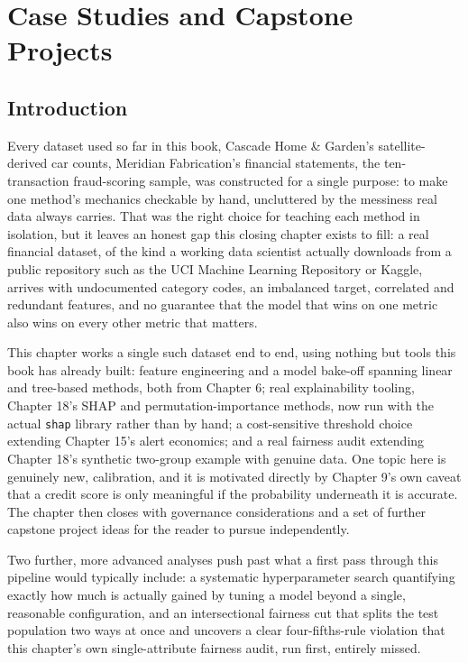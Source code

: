 \documentclass[../ai_in_finance]{subfiles}
\begin{document}
\chapter{Case Studies and Capstone Projects}

\section{Introduction}

Every dataset used so far in this book, Cascade Home \& Garden's satellite-derived car counts, Meridian Fabrication's financial statements, the ten-transaction fraud-scoring sample, was constructed for a single purpose: to make one method's mechanics checkable by hand, uncluttered by the messiness real data always carries. That was the right choice for teaching each method in isolation, but it leaves an honest gap this closing chapter exists to fill: a real financial dataset, of the kind a working data scientist actually downloads from a public repository such as the UCI Machine Learning Repository or Kaggle, arrives with undocumented category codes, an imbalanced target, correlated and redundant features, and no guarantee that the model that wins on one metric also wins on every other metric that matters.

This chapter works a single such dataset end to end, using nothing but tools this book has already built: feature engineering and a model bake-off spanning linear and tree-based methods, both from Chapter 6; real explainability tooling, Chapter 18's SHAP and permutation-importance methods, now run with the actual \texttt{shap} library rather than by hand; a cost-sensitive threshold choice extending Chapter 15's alert economics; and a real fairness audit extending Chapter 18's synthetic two-group example with genuine data. One topic here is genuinely new, calibration, and it is motivated directly by Chapter 9's own caveat that a credit score is only meaningful if the probability underneath it is accurate. The chapter then closes with governance considerations and a set of further capstone project ideas for the reader to pursue independently.

Two further, more advanced analyses push past what a first pass through this pipeline would typically include: a systematic hyperparameter search quantifying exactly how much is actually gained by tuning a model beyond a single, reasonable configuration, and an intersectional fairness cut that splits the test population two ways at once and uncovers a clear four-fifths-rule violation that this chapter's own single-attribute fairness audit, run first, entirely missed.
\end{document}

